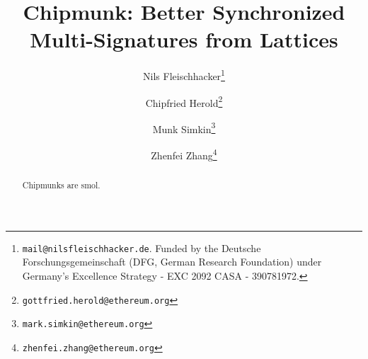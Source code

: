 \documentclass[11pt]{llncs}
\title{Chipmunk: Better Synchronized Multi-Signatures from Lattices}
\author{
 	Nils Fleischhacker\inst{1}\thanks{\texttt{mail@nilsfleischhacker.de}. Funded by the Deutsche Forschungsgemeinschaft (DFG, German Research Foundation) under Germany's Excellence Strategy - EXC 2092 CASA - 390781972.}%
 	\and
 	Chipfried Herold\inst{2}\thanks{\texttt{gottfried.herold@ethereum.org}}%
 	\and
 	Munk Simkin\inst{2}\thanks{\texttt{mark.simkin@ethereum.org}}%
   \and
   Zhenfei Zhang\inst{2}\thanks{\texttt{zhenfei.zhang@ethereum.org}}%
}
\institute{
	 Ruhr University Bochum
	 \and
	 Ethereum Foundation
}
\begin{document}
\pagestyle{plain}

\maketitle
\noindent
\makebox[\linewidth]{\small \today}

\begin{abstract}

Chipmunks are smol.
\cite{CCS:FleSimZha22}

\end{abstract}













%
\begin{appendix}
  
\end{appendix}
\end{document}
